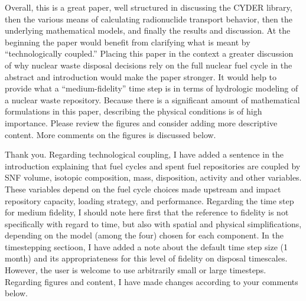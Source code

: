 \documentclass[answers,12pt]{exam}
\begin{document}
\begin{questions}
\question
Overall,  this  is  a  great  paper,  well  structured  in  discussing  the  CYDER  library,  then  the  various  means  of 
calculating  radionuclide  transport  behavior,  then  the  underlying  mathematical  models,  and  finally  the  results 
and  discussion.  At  the  beginning  the  paper  would  benefit  from  
clarifying  what  is  meant  by  ``technologically 
coupled.''  Placing  this  paper  in  the  context  a  greater  discussion  of  why  nuclear  waste  disposal  decisions  rely 
on  the  full  nuclear  fuel  cycle  in  the  abstract  and  introduction  would  make  the  paper stronger.  It would help 
to  provide  what  a  ``medium-fidelity''  time  step  is  in  terms  of  hydrologic  modeling  of  a  nuclear  waste 
repository.  Because  there  is  a  significant  amount  of  mathematical  formulations  in  this  paper,  describing  the 
physical  conditions  is  of  high  importance.  Please  review  the  figures  and  consider  adding  more  descriptive 
content. More comments on the figures is discussed below.  
\begin{solution}
Thank you.
        Regarding technological coupling, I have added a sentence in the 
        introduction explaining that fuel cycles and spent fuel repositories 
        are coupled by SNF volume, isotopic composition, mass, disposition, 
        activity and other variables. These variables depend on the fuel cycle 
        choices made upstream and impact repository capacity, loading strategy, 
        and performance.  
        Regarding the time step for medium fidelity, I should note here first 
        that the reference to fidelity is not specifically with regard to time, but 
        also with spatial and physical simplifications, depending on the model 
        (among the four) chosen for each component. In the timestepping 
        sectioon, I have added a note about 
        the default time step size (1 month) and its appropriateness for this level of 
        fidelity on disposal timescales. 
        However, the user is welcome to use arbitrarily small or large 
        timesteps. 
        Regarding figures and content, I have made changes according to your 
        comments below.
\end{solution} 


\end{questions}
\end{document}
